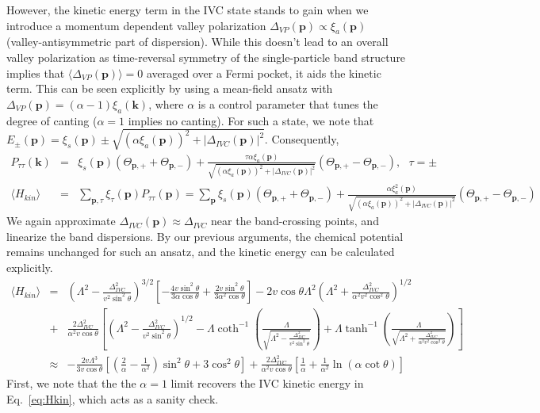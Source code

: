 \documentclass[aps,pra,twocolumn,superscriptaddress,10pt,article,nofootinbib,showpacs,longbibliography]{revtex4-1}
\def \k{{\mathbf k}}
\def \p{{\mathbf p}}
\def \beq{\begin{eqnarray}}
\def \eeq{\end{eqnarray}}
\def \nn{\nonumber \\}
\begin{document}
However, the kinetic energy term in the IVC state stands to gain when we introduce a momentum dependent valley polarization $\Delta_{VP}(\p)  \propto \xi_a(\p)$ (valley-antisymmetric part of dispersion). 
While this doesn't lead to an overall valley polarization as time-reversal symmetry of the single-particle band structure implies that $\langle \Delta_{VP}(\p) \rangle = 0$ averaged over a Fermi pocket, it aids the kinetic term. 
This can be seen explicitly by using a mean-field ansatz with $\Delta_{VP}(\p) = (\alpha - 1) \xi_a(\k)$, where $\alpha$ is a control parameter that tunes the degree of canting ($\alpha = 1$ implies no canting). 
For such a state, we note that $E_{\pm}(\p) = \xi_s(\p) \pm \sqrt{(\alpha \xi_a(\p))^2 + |\Delta_{IVC}(\p)|^2}$. Consequently, 
\beq
P_{\tau \tau}(\k) &=& \xi_s(\p) (\Theta_{\p,+} + \Theta_{\p,-}) + \frac{\tau \alpha \xi_a(\p)}{\sqrt{( \alpha \xi_{a}(\p))^2 + |\Delta_{IVC}(\p)|^2}} (\Theta_{\p,+} - \Theta_{\p,-}), ~~~ \tau = \pm \nn
\langle H_{kin} \rangle &=& \sum_{\p,\tau} \xi_{\tau}(\p) P_{\tau \tau}(\p) =  \sum_{\p} \xi_s(\p) (\Theta_{\p,+} + \Theta_{\p,-}) + \frac{\alpha \xi^2_a(\p)}{\sqrt{ ( \alpha \xi_{a}(\p))^2 + |\Delta_{IVC}(\p)|^2}} (\Theta_{\p,+} - \Theta_{\p,-}) 
\eeq
We again approximate $\Delta_{IVC}(\p) \approx \Delta_{IVC}$ near the band-crossing points, and linearize the band dispersions. 
By our previous arguments, the chemical potential remains unchanged for such an ansatz, and the kinetic energy can be calculated explicitly.
\beq
\langle H_{kin} \rangle  &=&  \left( \Lambda^2 - \frac{\Delta^2_{IVC}}{v^2 \sin^2 \theta} \right)^{3/2}  \left[ - \frac{4 v \sin^2\theta}{3 \alpha \cos\theta}+ \frac{2 v \sin^2\theta}{3 \alpha^2 \cos\theta} \right] - 2 v \cos\theta \Lambda^2 \left( \Lambda^2 + \frac{\Delta^2_{IVC}}{\alpha^2 v^2 \cos^2 \theta}  \right)^{1/2} \nn
&+&  \frac{2 \Delta_{IVC}^2}{\alpha^2 v \cos\theta} \left[ \left( \Lambda^2 - \frac{\Delta^2_{IVC}}{v^2 \sin^2 \theta}  \right)^{1/2} -  \Lambda \coth^{-1}\left( \frac{\Lambda}{\sqrt{\Lambda^2 - \frac{\Delta^2_{IVC}}{v^2 \sin^2 \theta} }} \right) + \Lambda \tanh^{-1} \left( \frac{\Lambda}{\sqrt{ \Lambda^2 + \frac{\Delta^2_{IVC}}{\alpha^2 v^2 \cos^2 \theta}} } \right) \right] \nn
& \approx & -\frac{2 v \Lambda^3}{3 v \cos\theta} \left[  \left( \frac{2}{\alpha} - \frac{1}{\alpha^2} \right) \sin^2\theta + 3 \cos^2\theta \right] +  \frac{2 \Delta_{IVC}^2}{\alpha^2 v \cos\theta} \left[ \frac{1}{\alpha} + \frac{1}{\alpha^2}\ln(\alpha \cot\theta) \right]
\eeq
First, we note that the the $\alpha = 1$ limit recovers the IVC kinetic energy in Eq.~\eqref{eq:Hkin}, which acts as a sanity check. 
\end{document}
